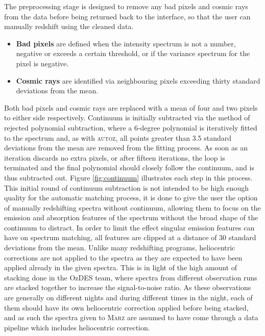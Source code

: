 \documentclass[iop]{emulateapj}
\newcommand{\autoz}{\textsc{autoz}}
\newcommand{\marz}{\textsc{Marz}}
\begin{document}
The preprocessing stage is designed to remove any bad pixels and cosmic rays from the data before being returned back to the interface, so that the user can manually redshift using the cleaned data.
\begin{itemize}
\item \textbf{Bad pixels} are defined when the intensity spectrum is not a number, negative or exceeds a certain threshold, or if the variance spectrum for the pixel is negative.
\item \textbf{Cosmic rays} are identified via neighbouring pixels exceeding thirty standard deviations from the mean.
\end{itemize}
Both bad pixels and cosmic rays are replaced with a mean of four and two pixels to either side respectively. Continuum is initially subtracted via the method of rejected polynomial subtraction, where a 6-degree polynomial is iteratively fitted to the spectrum and, as with \autoz{}, all points greater than 3.5 standard deviations from the mean are removed from the fitting process. As soon as an iteration discards no extra pixels, or after fifteen iterations, the loop is terminated and the final polynomial should closely follow the continuum, and is thus subtracted out. Figure \ref{fig:continuum} illustrates each step in this process. This initial round of continuum subtraction is not intended to be high enough quality for the automatic matching process, it is done to give the user the option of manually redshifting spectra without continuum, allowing them to focus on the emission and absorption features of the spectrum without the broad shape of the continuum to distract. In order to limit the effect singular emission features can have on spectrum matching, all features are clipped at a distance of 30 standard deviations from the mean. Unlike many redshifting programs, heliocentric corrections are not applied to the spectra as they are expected to have been applied already in the given spectra. This is in light of the high amount of stacking done in the OzDES team, where spectra from different observation runs are stacked together to increase the signal-to-noise ratio. As these observations are generally on different nights and during different times in the night, each of them should have its own heliocentric correction applied before being stacked, and as such the spectra given to \marz{} are assumed to have come through a data pipeline which includes heliocentric correction.\\
\end{document}
